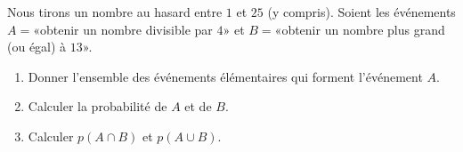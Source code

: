 
\begin{exercice}\label{exosmath-0287}

    Nous tirons un nombre au hasard entre \( 1\) et \( 25\) (y compris). Soient les événements \( A=\)«obtenir un nombre divisible par \( 4\)» et \( B=\)«obtenir un nombre plus grand (ou égal) à \( 13\)».
    \begin{enumerate}
        \item
            Donner l'ensemble des événements élémentaires qui forment l'événement \( A\).
        \item
            Calculer la probabilité de \( A\) et de \( B\). 
        \item
            Calculer \( p(A\cap B)\) et \( p(A\cup B)\).
    \end{enumerate}

\end{exercice}
